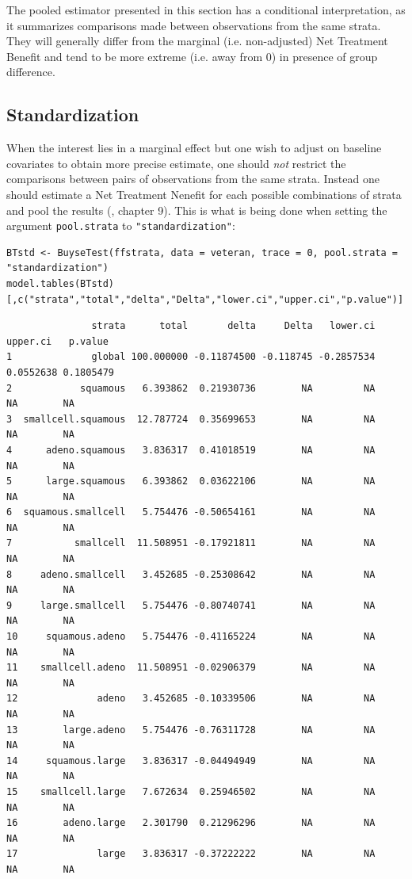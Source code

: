 \documentclass[12pt]{article}
\newcommand\Warning[1][3ex]{%
\renewcommand\stacktype{L}%
\scaleto{\stackon[1.3pt]{\color{red}$\triangle$}{\tiny\bfseries !}}{#1}%
\xspace
}
\begin{document}
\Warning The pooled estimator presented in this section has a
conditional interpretation, as it summarizes comparisons made between
observations from the same strata. They will generally differ from the
marginal (i.e. non-adjusted) Net Treatment Benefit and tend to be more
extreme (i.e. away from 0) in presence of group difference.

\subsection{Standardization}
\label{sec:org4154ab2}

When the interest lies in a marginal effect but one wish to adjust on
baseline covariates to obtain more precise estimate, one should \emph{not}
restrict the comparisons between pairs of observations from the same
strata. Instead one should estimate a Net Treatment Nenefit for each
possible combinations of strata and pool the results
(\cite{buyse2025gpc}, chapter 9). This is what is being done when
setting the argument \texttt{pool.strata} to \texttt{"standardization"}:
\lstset{language=r,label= ,caption= ,captionpos=b,numbers=none}
\begin{lstlisting}
BTstd <- BuyseTest(ffstrata, data = veteran, trace = 0, pool.strata = "standardization")
model.tables(BTstd)[,c("strata","total","delta","Delta","lower.ci","upper.ci","p.value")]
\end{lstlisting}

\begin{verbatim}
               strata      total       delta     Delta   lower.ci  upper.ci   p.value
1              global 100.000000 -0.11874500 -0.118745 -0.2857534 0.0552638 0.1805479
2            squamous   6.393862  0.21930736        NA         NA        NA        NA
3  smallcell.squamous  12.787724  0.35699653        NA         NA        NA        NA
4      adeno.squamous   3.836317  0.41018519        NA         NA        NA        NA
5      large.squamous   6.393862  0.03622106        NA         NA        NA        NA
6  squamous.smallcell   5.754476 -0.50654161        NA         NA        NA        NA
7           smallcell  11.508951 -0.17921811        NA         NA        NA        NA
8     adeno.smallcell   3.452685 -0.25308642        NA         NA        NA        NA
9     large.smallcell   5.754476 -0.80740741        NA         NA        NA        NA
10     squamous.adeno   5.754476 -0.41165224        NA         NA        NA        NA
11    smallcell.adeno  11.508951 -0.02906379        NA         NA        NA        NA
12              adeno   3.452685 -0.10339506        NA         NA        NA        NA
13        large.adeno   5.754476 -0.76311728        NA         NA        NA        NA
14     squamous.large   3.836317 -0.04494949        NA         NA        NA        NA
15    smallcell.large   7.672634  0.25946502        NA         NA        NA        NA
16        adeno.large   2.301790  0.21296296        NA         NA        NA        NA
17              large   3.836317 -0.37222222        NA         NA        NA        NA
\end{verbatim}
\end{document}

